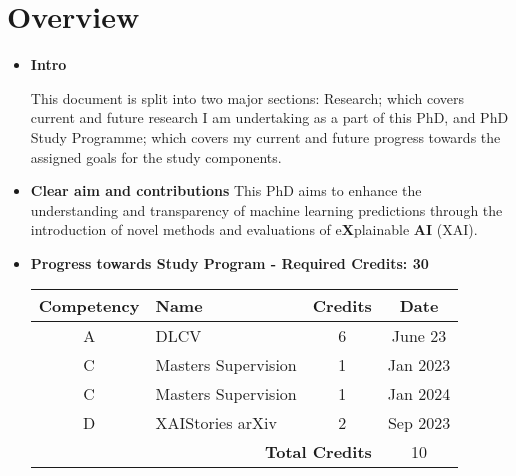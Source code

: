 \section{Overview}

\begin{itemize}
    \item \textbf{Intro}

    This document is split into two major sections: 
    Research; which covers current and future research I am undertaking as a part of this PhD, 
    and PhD Study Programme; which covers my current and future progress towards 
    the assigned goals for the study components.
    
    \item \textbf{Clear aim and contributions}
    This PhD aims to enhance the understanding and transparency of machine learning 
    predictions through the introduction of novel methods and evaluations of e\textbf{X}plainable \textbf{AI} (XAI).

    \item \textbf{Progress towards Study Program - Required Credits: 30} \\
    \begin{tabular}{|c|l|c|c|}
        \hline
        \textbf{Competency} & \textbf{Name}             & \textbf{Credits} & \textbf{Date}   \\ \hline
        A                   & DLCV                      & 6                & June 23         \\ \hline
        C                   & Masters Supervision       & 1                & Jan 2023        \\ \hline
        C                   & Masters Supervision       & 1                & Jan 2024        \\ \hline
        D                   & XAIStories arXiv          & 2                & Sep 2023        \\ \hline
        \multicolumn{3}{|r|}{\textbf{Total Credits}}   & 10               \\ \hline
    \end{tabular}
\end{itemize}